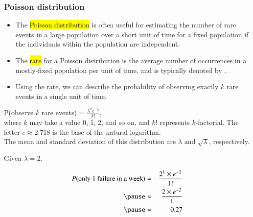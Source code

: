 \begin{frame}
\frametitle{Poisson distribution}

\begin{itemize}

\item The \hl{Poisson distribution} is often useful for estimating the number of rare events in a large population over a short unit of time for a fixed population if the individuals within the population are independent.

\item The \hl{rate} for a Poisson distribution is the average number of occurrences in a mostly-fixed population per unit of time, and is typically denoted by \mathhl{\lambda}.

\item Using the rate, we can describe the probability of observing exactly $k$ rare events in a single unit of time.

\end{itemize}

\vfill

{
P(observe $k$ rare events) = $\frac{\lambda^k e^{-\lambda}}{k!}$, \\
where $k$ may take a value 0, 1, 2, and so on, and $k!$ represents $k$-factorial. The letter $e \approx 2.718$ is the base of the natural logarithm. \\

The mean and standard deviation of this distribution are $\lambda$ and $\sqrt{\lambda}$, respectively.
}

\end{frame}


\begin{frame}


\pause

Given $\lambda = 2$.

\pause

\begin{eqnarray*}
P(\text{only 1 failure in a week}) &=& \frac{2^1 \times e^{-2}}{1!} \\
\pause
&=& \frac{2 \times e^{-2}}{1} \\
\pause
&=& 0.27
\end{eqnarray*}

\end{frame}

